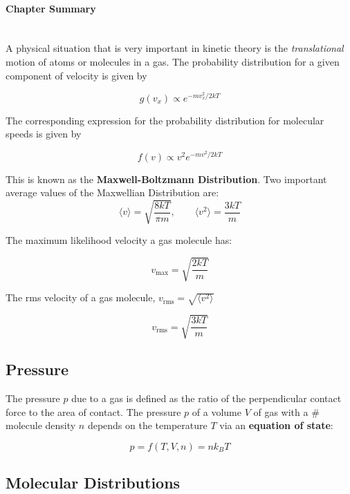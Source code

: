 \documentclass[svgnames]{article}     %
\begin{document}
\paragraph{Chapter Summary} \mbox{} \\

A physical situation that is very important in kinetic theory is the
\textit{translational} motion of atoms or molecules in a gas. The probability
distribution for a given component of velocity is given by 

\[
  g(v_x) \propto e^{-mv_x^2 / 2kT}
\] \vspace{5px}

The corresponding expression for the probability distribution for molecular
speeds is given by 

\[
  f(v) \propto v^2e^{-mv^2 / 2kT}
\] \vspace{5px}

This is known as the \textbf{Maxwell-Boltzmann Distribution}. Two important
average values of the Maxwellian Distribution are: 
 \[
\langle v \rangle = \sqrt{\frac{8kT}{\pi m}}, \qquad \langle v^2 \rangle
= \frac{3kT}{m}
\] \vspace{5px}

The maximum likelihood velocity a gas molecule has: 

\[
  v_\text{max} = \sqrt{\frac{2kT}{m}}
\] \vspace{5px}

The rms velocity of a gas molecule, $v_\text{rms} = \sqrt{\langle v^2 \rangle}$ 

\[
  v_\text{rms} = \sqrt{\frac{3kT}{m}}
\] \vspace{5px}

\subsection{Pressure}


The pressure $p$ due to a gas is defined as the ratio of the perpendicular
contact force to the area of contact. The pressure $p$ of a volume $V$ of gas
with a \# molecule density $n$ depends on the temperature $T$ via an
\textbf{equation of state}: 

\[
p = f(T, V, n) = nk_BT
\] \vspace{5px}

\subsection{Molecular Distributions}
\end{document}
